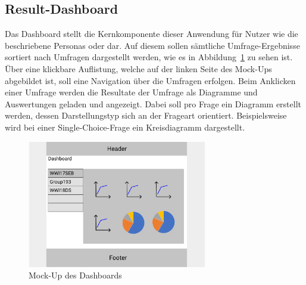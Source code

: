 \subsection{Result-Dashboard}
\label{ssec:konzept:client:dashboard}

Das Dashboard stellt die Kernkomponente dieser Anwendung für Nutzer wie die beschriebene Personas \dutzi oder \ariane dar.
Auf diesem sollen sämtliche Umfrage-Ergebnisse sortiert nach Umfragen dargestellt werden, wie es in Abbildung~\ref{fig:MockDashboard} zu sehen ist.
Über eine klickbare Auflistung, welche auf der linken Seite des Mock-Ups abgebildet ist, soll eine Navigation über die Umfragen erfolgen.
Beim Anklicken einer Umfrage werden die Resultate der Umfrage als Diagramme und Auswertungen geladen und angezeigt.
Dabei soll pro Frage ein Diagramm erstellt werden, dessen Darstellungstyp sich an der Frageart orientiert.
Beispielsweise wird bei einer Single-Choice-Frage ein Kreisdiagramm dargestellt.

\begin{figure}[H]
	\centering
	\includegraphics[width=0.7\textwidth]{img/konzeption/client/dashboard}
	\captionsetup{justification=centering, format=plain}
	\caption[Mock-Up des Dashboards]{Mock-Up des Dashboards \\\figma}
	\label{fig:MockDashboard}
\end{figure}

